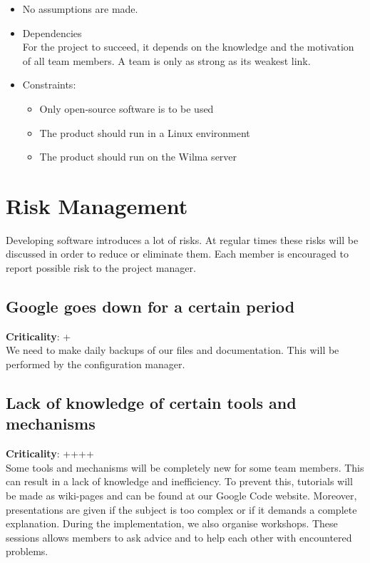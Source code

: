\documentclass[salesmen, twoside]{../../../templates/latex/2009/softproj}
\begin{document}
\begin{projdoc}
\begin{itemize}
				\item No assumptions are made.
				
				\item Dependencies \\
 				For the project to succeed, it depends on the knowledge and the motivation of all team members. 
				A team is only as strong as its weakest link.	
				
				\item Constraints:
				\begin{itemize}
					\item Only open-source software is to be used
					\item The product should run in a Linux environment
					\item The product should run on the Wilma server
				\end{itemize}
				
			\end{itemize}	
			
		\section{Risk Management}
			
			Developing software introduces a lot of risks. At regular times these risks will
			be discussed in order to reduce or eliminate them. Each member is encouraged to report
			possible risk to the project manager.
			
			\subsection{Google goes down for a certain period}
			\textbf{Criticality}: + \\
			We need to make daily backups of our files and documentation. This will be 
			performed by the configuration manager.
			
			
			\subsection{Lack of knowledge of certain tools and mechanisms}
			\textbf{Criticality}: ++++ \\
			Some tools and mechanisms will be completely new for some team members. This can
			result in a lack of knowledge and inefficiency. To prevent this, tutorials will be
			made as wiki-pages and can be found at our Google Code website. 
			Moreover, presentations are given if the subject is 
			too complex or if it demands a complete explanation. During the implementation, we also organise workshops.			
			These sessions allows members to ask advice and to help each other with encountered problems.
			

\end{projdoc}
\end{document}
